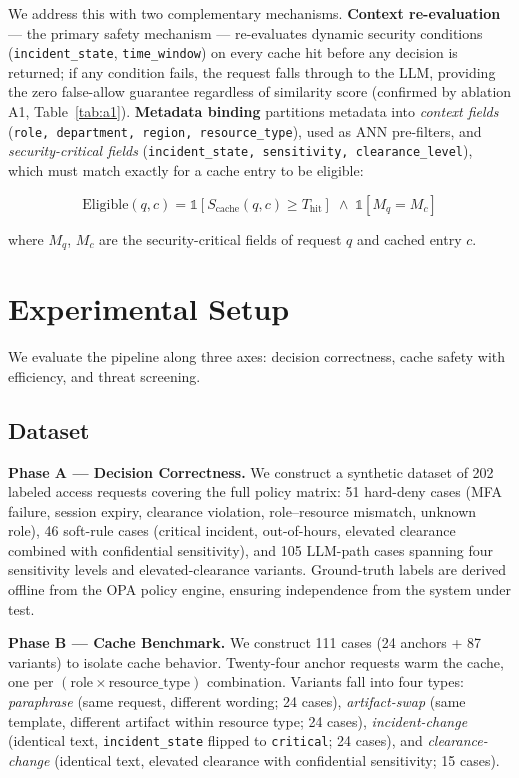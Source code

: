 \documentclass[runningheads]{llncs}
\begin{document}
We address this with two complementary mechanisms. \textbf{Context re-evaluation} — the primary safety mechanism — re-evaluates dynamic security conditions (\texttt{incident\_state}, \texttt{time\_window}) on every cache hit before any decision is returned; if any condition fails, the request falls through to the LLM, providing the zero false-allow guarantee regardless of similarity score (confirmed by ablation A1, Table~\ref{tab:a1}). \textbf{Metadata binding} partitions metadata into \textit{context fields} (\texttt{role, department, region, resource\_type}), used as ANN pre-filters, and \textit{security-critical fields} (\texttt{incident\_state, sensitivity, clearance\_level}), which must match exactly for a cache entry to be eligible:

$$\text{Eligible}(q, c) = \mathbb{1}[S_{\text{cache}}(q,c) \geq T_{\text{hit}}] \;\wedge\; \mathbb{1}[M_q = M_c]$$

\noindent where $M_q$, $M_c$ are the security-critical fields of request $q$ and cached entry $c$.

\section{Experimental Setup}
We evaluate the pipeline along three axes: decision correctness, cache safety with efficiency, and threat screening.

\subsection{Dataset}

\noindent\textbf{Phase A --- Decision Correctness.} We construct a synthetic dataset of 202 labeled access requests covering the full policy matrix: 51 hard-deny cases (MFA failure, session expiry, clearance violation, role--resource mismatch, unknown role), 46 soft-rule cases (critical incident, out-of-hours, elevated clearance combined with confidential sensitivity), and 105 LLM-path cases spanning four sensitivity levels and elevated-clearance variants. Ground-truth labels are derived offline from the OPA policy engine, ensuring independence from the system under test.

\noindent\textbf{Phase B --- Cache Benchmark.} We construct 111 cases (24 anchors + 87 variants) to isolate cache behavior. Twenty-four anchor requests warm the cache, one per $(\text{role} \times \text{resource\_type})$ combination. Variants fall into four types: \textit{paraphrase} (same request, different wording; 24 cases), \textit{artifact-swap} (same template, different artifact within resource type; 24 cases), \textit{incident-change} (identical text, \texttt{incident\_state} flipped to \texttt{critical}; 24 cases), and \textit{clearance-change} (identical text, elevated clearance with confidential sensitivity; 15 cases).
\end{document}
